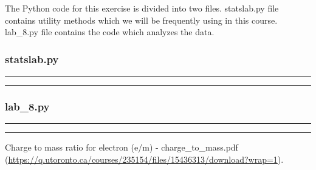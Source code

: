\documentclass[a4paper,12pt]{article}
\begin{document}
The Python code for this exercise is divided into two files. statslab.py file contains utility methods
which we will be frequently using in this course. lab\_8.py file contains the code which analyzes
the data.

\subsubsection{statslab.py}
\noindent\rule{\textwidth}{1pt}

\noindent\rule{\textwidth}{1pt}

\pagebreak

\subsubsection{lab\_8.py}
\noindent\rule{\textwidth}{1pt}

\noindent\rule{\textwidth}{1pt}


\pagebreak

\begin{thebibliography}{99}

 Charge to mass ratio for electron (e/m) - charge\_to\_mass.pdf (\url{https://q.utoronto.ca/courses/235154/files/15436313/download?wrap=1}).

\end{thebibliography}
  
  
\end{document}
